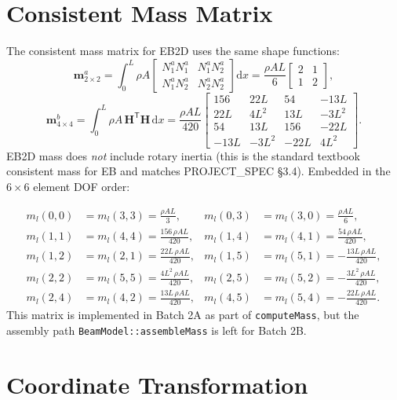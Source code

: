 \documentclass[11pt,a4paper]{article}
\newcommand{\dd}{\mathrm{d}}
\newcommand{\bmath}[1]{\boldsymbol{#1}}
\begin{document}
\section{Consistent Mass Matrix}\label{sec:mass-local}

The consistent mass matrix for EB2D uses the same shape functions:
\[
\bmath{m}^a_{2\times 2} = \int_0^L \rho A
\begin{bmatrix} N_1^a N_1^a & N_1^a N_2^a \\ N_1^a N_2^a & N_2^a N_2^a \end{bmatrix} \dd x
= \frac{\rho A L}{6}\begin{bmatrix} 2 & 1 \\ 1 & 2 \end{bmatrix},
\]
\[
\bmath{m}^b_{4\times 4} = \int_0^L \rho A\,\bmath{H}^\mathsf{T}\bmath{H}\,\dd x
= \frac{\rho A L}{420}
\begin{bmatrix}
156 & 22L & 54 & -13L \\
22L & 4L^2 & 13L & -3L^2 \\
54 & 13L & 156 & -22L \\
-13L & -3L^2 & -22L & 4L^2
\end{bmatrix}.
\]
EB2D mass does \emph{not} include rotary inertia (this is the standard textbook consistent mass for EB and matches PROJECT\_SPEC \S 3.4). Embedded in the $6\times 6$ element DOF order:

\begin{align*}
m_l(0,0) &= m_l(3,3) = \tfrac{\rho A L}{3}, & m_l(0,3) &= m_l(3,0) = \tfrac{\rho A L}{6}, \\
m_l(1,1) &= m_l(4,4) = \tfrac{156\,\rho A L}{420}, & m_l(1,4) &= m_l(4,1) = \tfrac{54\,\rho A L}{420}, \\
m_l(1,2) &= m_l(2,1) = \tfrac{22 L\,\rho A L}{420}, & m_l(1,5) &= m_l(5,1) = -\tfrac{13 L\,\rho A L}{420}, \\
m_l(2,2) &= m_l(5,5) = \tfrac{4 L^2\,\rho A L}{420}, & m_l(2,5) &= m_l(5,2) = -\tfrac{3 L^2\,\rho A L}{420}, \\
m_l(2,4) &= m_l(4,2) = \tfrac{13 L\,\rho A L}{420}, & m_l(4,5) &= m_l(5,4) = -\tfrac{22 L\,\rho A L}{420}.
\end{align*}
This matrix is implemented in Batch 2A as part of \texttt{computeMass}, but the assembly path \texttt{BeamModel::assembleMass} is left for Batch 2B.

\section{Coordinate Transformation}
\end{document}

